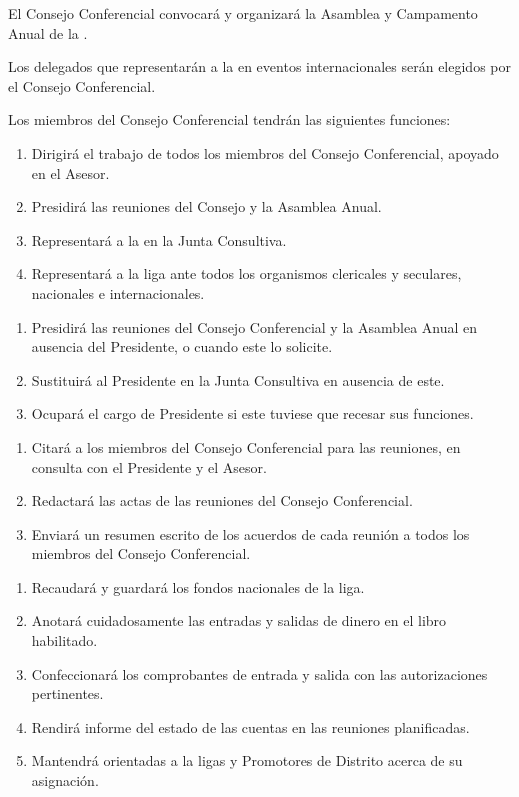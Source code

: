 \article
El Consejo Conferencial convocará y organizará la Asamblea y Campamento Anual de la \LMJ{}.

\article
Los delegados que representarán a la \LMJ{} en eventos internacionales serán elegidos por el Consejo Conferencial.

\article
Los miembros del Consejo Conferencial tendrán las siguientes funciones:

\begin{enumerate}
    \item Dirigirá el trabajo de todos los miembros del Consejo Conferencial, apoyado en el Asesor.
    \item Presidirá las reuniones del Consejo y la Asamblea Anual.
    \item Representará a la \LMJ{} en la Junta Consultiva.
    \item Representará a la liga ante todos los organismos clericales y seculares, nacionales e internacionales.
\end{enumerate}

\begin{enumerate}
    \item Presidirá las reuniones del Consejo Conferencial y la Asamblea Anual en ausencia del Presidente, o cuando este lo solicite.
    \item Sustituirá al Presidente en la Junta Consultiva en ausencia de este.
    \item Ocupará el cargo de Presidente si este tuviese que recesar sus funciones.
\end{enumerate}

\begin{enumerate}
    \item Citará a los miembros del Consejo Conferencial para las reuniones, en consulta con el Presidente y el Asesor.
    \item Redactará las actas de las reuniones del Consejo Conferencial.
    \item Enviará un resumen escrito de los acuerdos de cada reunión a todos los miembros del Consejo Conferencial.
\end{enumerate}

\begin{enumerate}
    \item Recaudará y guardará los fondos nacionales de la liga.
    \item Anotará cuidadosamente las entradas y salidas de dinero en el libro habilitado.
    \item Confeccionará los comprobantes de entrada y salida con las autorizaciones pertinentes.
    \item Rendirá informe del estado de las cuentas en las reuniones planificadas.
    \item Mantendrá orientadas a la ligas y Promotores de Distrito acerca de su asignación.
\end{enumerate}

